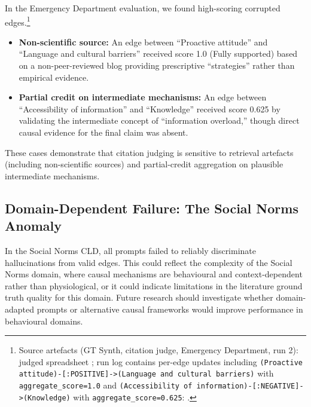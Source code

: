 In the Emergency Department evaluation, we found high-scoring corrupted edges.\footnote{Source artefacts (GT Synth, citation judge, Emergency Department, run 2): judged spreadsheet ; run log contains per-edge updates including \texttt{(Proactive attitude)-[:POSITIVE]->(Language and cultural barriers)} with \texttt{aggregate\_score=1.0} and \texttt{(Accessibility of information)-[:NEGATIVE]->(Knowledge)} with \texttt{aggregate\_score=0.625}: .}%
\begin{itemize}[noitemsep]
    \item \textbf{Non-scientific source:} An edge between ``Proactive attitude'' and ``Language and cultural barriers'' received score 1.0 (Fully supported) based on a non-peer-reviewed blog providing prescriptive ``strategies'' rather than empirical evidence.
    \item \textbf{Partial credit on intermediate mechanisms:} An edge between ``Accessibility of information'' and ``Knowledge'' received score 0.625 by validating the intermediate concept of ``information overload,'' though direct causal evidence for the final claim was absent.
\end{itemize}

These cases demonstrate that citation judging is sensitive to retrieval artefacts (including non-scientific sources) and partial-credit aggregation on plausible intermediate mechanisms.

\subsection{Domain-Dependent Failure: The Social Norms Anomaly}

In the Social Norms CLD, all prompts failed to reliably discriminate hallucinations from valid edges. This could reflect the complexity of the Social Norms domain, where causal mechanisms are behavioural and context-dependent rather than physiological, or it could indicate limitations in the literature ground truth quality for this domain. Future research should investigate whether domain-adapted prompts or alternative causal frameworks would improve performance in behavioural domains.

